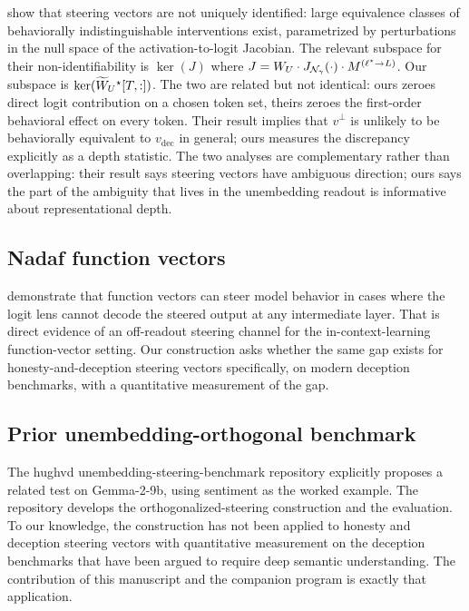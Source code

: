 \documentclass[11pt,letterpaper]{article}
\theoremstyle{plain}
\theoremstyle{definition}
\newcommand{\1}{\mathbf{1}}
\newcommand{\WU}{W_{U}\mathchoice{}{}{}{}}
\newcommand{\WUt}{\widetilde{W}_{U}\mathchoice{}{}{}{}}
\newcommand{\vdec}{v_{\text{dec}}}
\newcommand{\vperp}{v^{\perp}}
\begin{document}
\cite{venkatesh2026nonid} show that steering vectors are not uniquely identified: large equivalence classes of behaviorally indistinguishable interventions exist, parametrized by perturbations in the null space of the activation-to-logit Jacobian. The relevant subspace for their non-identifiability is $\ker(J)$ where $J = \WU \cdot J_{\mathcal{N}_\gamma}(\cdot) \cdot M^{(\ell^\star \to L)}$. Our subspace is $\ker(\WUt^\star[T,:])$. The two are related but not identical: ours zeroes direct logit contribution on a chosen token set, theirs zeroes the first-order behavioral effect on every token. Their result implies that $\vperp$ is unlikely to be behaviorally equivalent to $\vdec$ in general; ours measures the discrepancy explicitly as a depth statistic. The two analyses are complementary rather than overlapping: their result says steering vectors have ambiguous direction; ours says the part of the ambiguity that lives in the unembedding readout is informative about representational depth.

\subsection{Nadaf function vectors}

\cite{nadaf2026function} demonstrate that function vectors can steer model behavior in cases where the logit lens cannot decode the steered output at any intermediate layer. That is direct evidence of an off-readout steering channel for the in-context-learning function-vector setting. Our construction asks whether the same gap exists for honesty-and-deception steering vectors specifically, on modern deception benchmarks, with a quantitative measurement of the gap.

\subsection{Prior unembedding-orthogonal benchmark}

The hughvd unembedding-steering-benchmark repository \cite{hughvd2024benchmark} explicitly proposes a related test on Gemma-2-9b, using sentiment as the worked example. The repository develops the orthogonalized-steering construction and the evaluation. To our knowledge, the construction has not been applied to honesty and deception steering vectors with quantitative measurement on the deception benchmarks that have been argued to require deep semantic understanding. The contribution of this manuscript and the companion program is exactly that application.
\end{document}
